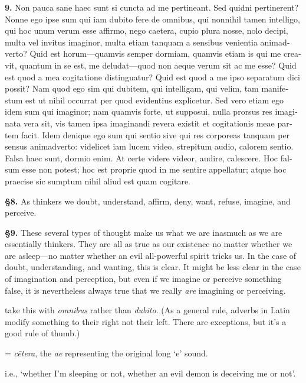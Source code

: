 \beginnumbering
\pstart
\begin{latin}
    \textenglish{\textbf{9.}} Non pauca sane haec sunt si cuncta ad me pertineant. Sed quidni pertinerent? Nonne ego ipse sum qui iam dubito fere de omnibus, qui nonnihil tamen intelligo, qui hoc unum verum esse affirmo, nego caetera, cupio plura nosse, nolo decipi, multa vel invitus imaginor, multa etiam tanquam a sensibus venientia animadverto? Quid est horum---quamvis semper dormiam, quamvis etiam is qui me creavit, quantum in se est, me deludat---quod non aeque verum sit ac me esse? Quid est quod a mea cogitatione distinguatur? Quid est quod a me ipso separatum dici possit? Nam quod ego sim qui dubitem, qui intelligam, qui velim, tam manifestum est ut nihil occurrat per quod evidentius explicetur. Sed vero etiam ego idem sum qui imaginor; nam quamvis forte, ut supposui, nulla prorsus res imaginata vera sit, vis tamen ipsa imaginandi revera existit et cogitationis meae partem facit. Idem denique ego sum qui sentio sive qui res corporeas tanquam per sensus animadverto: videlicet iam lucem video, strepitum audio, calorem sentio. Falsa haec sunt, dormio enim. At certe videre videor, audire, calescere. Hoc falsum esse non potest; hoc est proprie quod in me sentire appellatur; atque hoc praecise sic sumptum nihil aliud est quam cogitare.
\end{latin}
\pend
\endnumbering

\prenotes

\textbf{§8.} As thinkers we doubt, understand, affirm, deny, want, refuse, imagine, and perceive.

\textbf{§9.} These several types of thought make us what we are inasmuch as we are essentially thinkers. They are all as true as our existence no matter whether we are asleep---no matter whether an evil all-powerful spirit tricks us. In the case of doubt, understanding, and wanting, this is clear. It might be less clear in the case of imagination and perception, but even if we imagine or perceive something false, it is nevertheless always true that we really \textit{are} imagining or perceiving.

 take this with \textit{omnibus} rather than \textit{dubito}. (As a general rule, adverbs in Latin modify something to their right not their left. There are exceptions, but it's a good rule of thumb.)

 = \textit{cētera}, the \textit{ae} representing the original long `e' sound.

 i.e., `whether I'm sleeping or not, whether an evil demon is deceiving me or not'.


